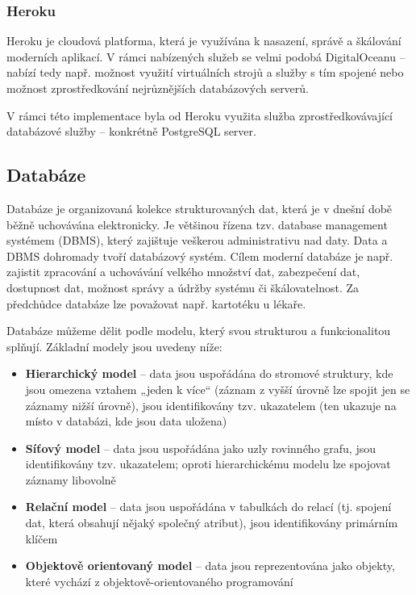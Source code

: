 		\subsubsection{Heroku}
		Heroku je cloudová platforma, která je využívána k nasazení, správě a škálování moderních aplikací. V rámci nabízených služeb se velmi podobá DigitalOceanu – nabízí tedy např. možnost využití virtuálních strojů a služby s tím spojené nebo možnost zprostředkování nejrůznějších databázových serverů. \cite{Heroku1} \cite{Heroku2}
		
		V rámci této implementace byla od Heroku využita služba zprostředkovávající databázové služby – konkrétně PostgreSQL server. 
		
	\subsection{Databáze}
	Databáze je organizovaná kolekce strukturovaných dat, která je v dnešní době běžně uchovávána elektronicky. Je většinou řízena tzv. database management systémem (DBMS), který zajištuje veškerou administrativu nad daty. Data a DBMS dohromady tvoří databázový systém. Cílem moderní databáze je např. zajistit zpracování a uchovávání velkého množství dat, zabezpečení dat, dostupnost dat, možnost správy a údržby systému či škálovatelnost. Za předchůdce databáze lze považovat např. kartotéku u lékaře. \cite{DBSummary}
	
	Databáze můžeme dělit podle modelu, který svou strukturou a funkcionalitou splňují. Základní modely jsou uvedeny níže: \cite{DBModel}
		
	\begin{itemize}
		\item \textbf{Hierarchický model} – data jsou uspořádána do stromové struktury, kde jsou omezena vztahem „jeden k více“ (záznam z vyšší úrovně lze spojit jen se záznamy nižší úrovně), jsou identifikovány tzv. ukazatelem (ten ukazuje na místo v databázi, kde jsou data uložena) \cite{HierarchDB}
		\item \textbf{Síťový model} – data jsou uspořádána jako uzly rovinného grafu, jsou identifikovány tzv. ukazatelem; oproti hierarchickému modelu lze spojovat záznamy libovolně \cite{SitDB} 
		\item \textbf{Relační model} – data jsou uspořádána v tabulkách do relací (tj. spojení dat, která obsahují nějaký společný atribut), jsou identifikovány primárním klíčem \cite{RelacDB}
		\item \textbf{Objektově orientovaný model} – data jsou reprezentována jako objekty, které vychází z objektově-orientovaného programování \cite{OOPDB}
	\end{itemize}
	
